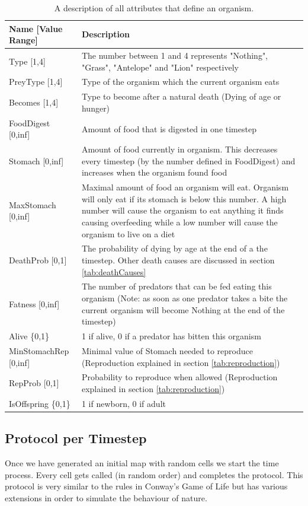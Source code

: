 \documentclass[11pt]{article}
\begin{document}
\begin{table}[htbp]
\centering
\begin{tabular}{l|p{10.3cm}}
Name [Value Range]& Description\\
\hline 
\hline 
Type [1,4]& The number between 1 and 4 represents "Nothing", "Grass", "Antelope" and "Lion" respectively  \\ 
\hline 
PreyType [1,4] & Type of the organism which the current organism eats \\ 
\hline 
Becomes [1,4]& Type to become after a natural death (Dying of age or hunger) \\ 
\hline 
FoodDigest [0,inf]& Amount of food that is digested in one timestep\\ 
\hline 
Stomach [0,inf]& Amount of food currently in organism. This decreases every timestep (by the number defined in FoodDigest) and increases when the organism found food\\ 
\hline 
MaxStomach [0,inf]& Maximal amount of food an organism will eat. Organism will only eat if its stomach is below this number. A high number will cause the organism to eat anything it finds causing overfeeding while a low number will cause the organism to live on a diet \\ 
\hline 
DeathProb [0,1]& The probability of dying by age at the end of a the timestep. Other death causes are discussed in section \ref{tab:deathCauses} \\ 
\hline 
Fatness [0,inf]& The number of predators that can be fed eating this organism (Note: as soon as one predator takes a bite the current organism will become Nothing at the end of the timestep)\\ 
\hline 
Alive \{0,1\}& 1 if alive, 0 if a predator has bitten this organism\\
\hline 
MinStomachRep [0,inf]& Minimal value of Stomach needed to reproduce (Reproduction explained in section \ref{tab:reproduction}) \\
\hline 
RepProb [0,1]& Probability to reproduce when allowed (Reproduction explained in section \ref{tab:reproduction})\\
\hline 
IsOffspring \{0,1\}& 1 if newborn, 0 if adult\\
\end{tabular}
\caption{A description of all attributes that define an organism.}
\label{tab:Properties}
\end{table}

\subsection{Protocol per Timestep}
Once we have generated an initial map with random cells we start the time process. Every cell gets called (in random order) and completes the protocol. This protocol is very similar to the rules in Conway's Game of Life but has various extensions in order to simulate the behaviour of nature.
\setcounter{protocolCounter}{1}
\end{document}
